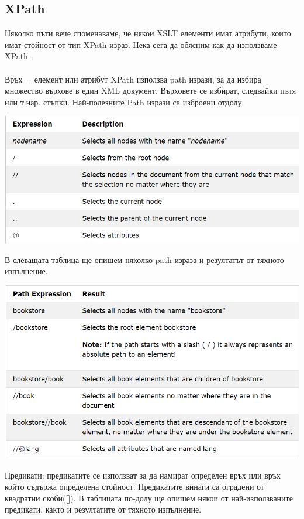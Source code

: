 \documentclass[11pt]{article} %
\begin{document}
\subsection{XPath}
Няколко пъти вече споменаваме, че някои XSLT елементи имат атрибути, които имат стойност от тип XPath израз. Нека сега да обясним как да използваме XPath. \\
\\ Връх = елемент или атрибут
XPath използва path изрази, за да избира множество върхове в един XML документ. Върховете се избират, следвайки пътя или т.нар. стъпки. Най-полезните Path изрази са изброени отдолу.\\
\begin{center}
\includegraphics[scale=0.75]{PathExpressions.png}
\end{center}

В слеващата таблица ще опишем няколко path израза и резултатът от тяхното изпълнение.
\begin{center}
\includegraphics[scale=0.75]{PathExpressionResults.png}
\end{center}

Предикати: предикатите се използват за да намират определен връх или връх който съдържа определена стойност. Предикатите винаги са оградени от квадратни скоби([]). В таблицата по-долу ще опишем някои от най-използваните предикати, както и резултатите от тяхното изпълнение. 
\end{document}
